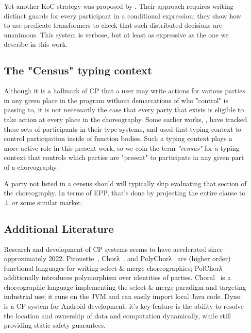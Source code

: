 Yet another KoC strategy was proposed by \cite{jongmans2022predicates}.
Their approach requires writing distinct guards for every
participant in a conditional expression; they show how to use predicate transformers to check that
such distributed decisions are unanimous.
This system is verbose, but at least as expressive as the one we describe in this work.

\subsection{The "Census" typing context}
\label{sec:census}
Although it is a hallmark of CP that a user may write actions for various parties in any given place in the program
without demarcations of who "control" is passing to,
it is not necessarily the case that every party that exists is eligible to take action at every place in the choreography.
Some earlier works, \eg \cite{chor-lambda}, have tracked these sets of participants in their type systems,
and used that typing context to control participation inside of function bodies.
Such a typing context plays a more active role in this present work, so we coin the term \emph{"census"}
for a typing context that controls which parties are "present" to participate in any given part of a choreography.

A party not listed in a census should will typically skip evaluating that section of the choreography.
In terms of EPP, that's done by projecting the entire clause to ⊥ or some similar marker.

\subsection{Additional Literature}
\label{sec:modern-work}

Research and development of CP systems seems to have accelerated since approximately 2022.
Pirouette~\cite{hirsch2021pirouette}, Chorλ~\cite{chor-lambda},
and  PolyChorλ~\cite{graversen2023polychor}
are (higher order) functional languages for writing select-\&-merge choreographies;
PolChorλ additionally introduces polymorphism over identities of parties.
Choral~\cite{giallorenzo-choral} is a choreographic language implementing the select-\&-merge paradigm
and targeting industrial use;
it runs on the JVM and can easily import local Java code.
Dyno~\cite{zakhour23} is a CP system for Android development;
it's key feature is the ability to resolve the location and ownership of data and computation dynamically,
while still providing static safety guarantees.

